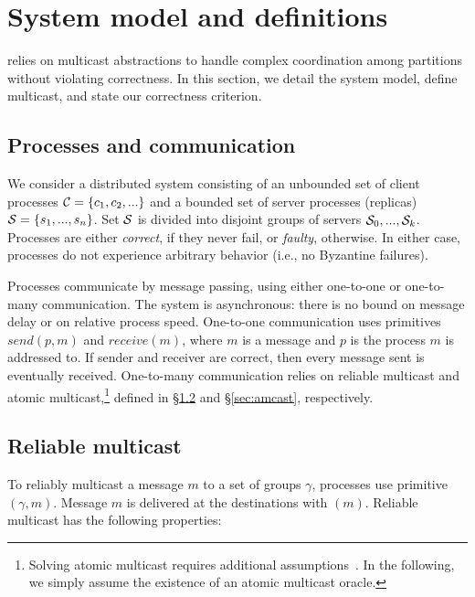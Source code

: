 \section{System model and definitions}
\label{sec:sysmodel}

\dynastar relies on multicast abstractions to handle complex coordination among partitions without violating correctness. 
In this section, we detail the system model, define multicast, and state our correctness criterion. 

\subsection{Processes and communication}

We consider a distributed system consisting of an unbounded set of
client processes $\mathcal{C} = \{c_1, c_2, ...\}$ and a bounded set of
server processes (replicas) $\mathcal{S} = \{s_1, ..., s_n\}$.  Set $\mathcal{S}$ is
divided into disjoint groups of servers $\mathcal{S}_0, ..., \mathcal{S}_k$.
Processes are either \emph{correct}, if they never fail, or
\emph{faulty}, otherwise.  In either case, processes do not experience
arbitrary behavior (i.e., no Byzantine failures).

Processes communicate by message passing, using either one-to-one or
one-to-many communication.  The system is asynchronous: there is no
bound on message delay or on relative process speed.  One-to-one
communication uses primitives $send(p,m)$ and $receive(m)$, where $m$
is a message and $p$ is the process $m$ is addressed to.  If sender
and receiver are correct, then every message sent is eventually
received.
%
One-to-many communication relies on reliable multicast and atomic
multicast,\footnote{Solving atomic multicast requires additional
  assumptions~\cite{CT96,FLP85}. In the following, we simply assume
  the existence of an atomic multicast oracle.} defined in
\S\ref{sec:rmcast} and \S\ref{sec:amcast}, respectively.


\subsection{Reliable multicast}
\label{sec:rmcast}

To reliably multicast a message $m$ to a set of groups $\gamma$,
processes use primitive \rmcast$(\gamma, m)$.  Message $m$ is
delivered at the destinations with \rmdel$(m)$.  Reliable multicast
has the following properties:

